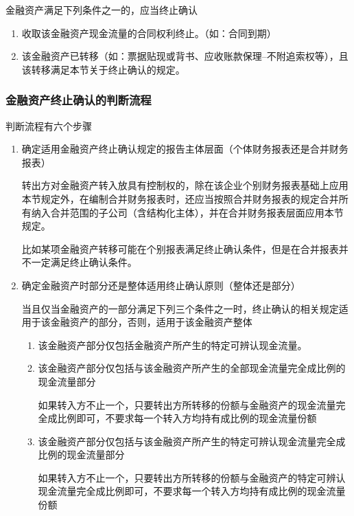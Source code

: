 \documentclass[UTF8,12pt]{ctexart}
\numberwithin{equation}{section} %
\numberwithin{figure}{section}
\numberwithin{table}{section}
\begin{document}
	金融资产满足下列条件之一的，应当终止确认
	\begin{enumerate}
		\item 收取该金融资产现金流量的合同权利终止。（如：合同到期）
		
		\item 该金融资产已转移（如：票据贴现或背书、应收账款保理--不附追索权等），且该转移满足本节关于终止确认的规定。
	\end{enumerate}
	
	\subsubsection{金融资产终止确认的判断流程}
	判断流程有六个步骤
	\begin{enumerate}
		\item 确定适用金融资产终止确认规定的报告主体层面（个体财务报表还是合并财务报表）
		
		转出方对金融资产转入放具有控制权的，除在该企业个别财务报表基础上应用本节规定外，在编制合并财务报表时，还应当按照合并财务报表的规定合并所有纳入合并范围的子公司（含结构化主体），并在合并财务报表层面应用本节规定。
		
		比如某项金融资产转移可能在个别报表满足终止确认条件，但是在合并报表并不一定满足终止确认条件。
		
		\item 确定金融资产时部分还是整体适用终止确认原则（整体还是部分）
		
		当且仅当金融资产的一部分满足下列三个条件之一时，终止确认的相关规定适用于该金融资产的部分，否则，适用于该金融资产整体
		\begin{enumerate}
			\item 该金融资产部分仅包括金融资产所产生的特定可辨认现金流量。
			
			\item 该金融资产部分仅包括与该金融资产所产生的全部现金流量完全成比例的现金流量部分
			
			如果转入方不止一个，只要转出方所转移的份额与金融资产的现金流量完全成比例即可，不要求每一个转入方均持有成比例的现金流量份额
			
			\item 该金融资产部分仅包括与该金融资产所产生的特定可辨认现金流量完全成比例的现金流量部分
			
			如果转入方不止一个，只要转出方所转移的份额与金融资产的特定可辨认现金流量完全成比例即可，不要求每一个转入方均持有成比例的现金流量份额
			
		\end{enumerate}
		

\end{enumerate}
\end{document}
